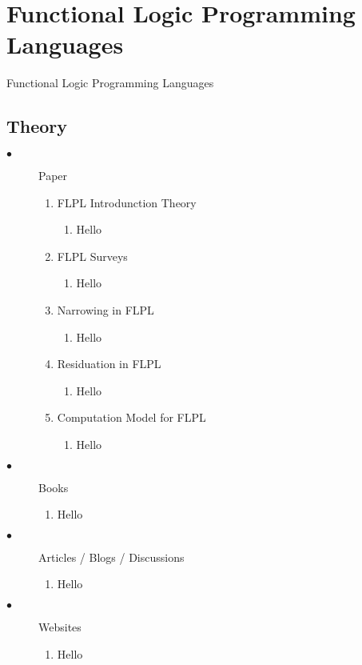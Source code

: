 \documentclass[proposal.tex]{subfiles}
\begin{document}
\chapter{Functional Logic Programming Languages}\label{chap:flpl}


Functional Logic Programming Languages

\section{Theory}
\begin{description}

\item[$\bullet$] Paper
\begin{enumerate}
\item FLPL Introdunction Theory
\begin{enumerate}
\item Hello
\end{enumerate}

\item FLPL Surveys
\begin{enumerate}
\item Hello
\end{enumerate}

\item Narrowing in FLPL 
\begin{enumerate}
\item Hello
\end{enumerate}

\item Residuation in FLPL
\begin{enumerate}
\item Hello
\end{enumerate}

\item Computation Model for FLPL
\begin{enumerate}
\item Hello
\end{enumerate}

\end{enumerate}

\item[$\bullet$] Books
\begin{enumerate}
\item Hello
\end{enumerate}

\item[$\bullet$] Articles / Blogs / Discussions
\begin{enumerate}
\item Hello
\end{enumerate}

\item[$\bullet$] Websites
\begin{enumerate}
\item Hello
\end{enumerate}

\end{description}
\end{document}
